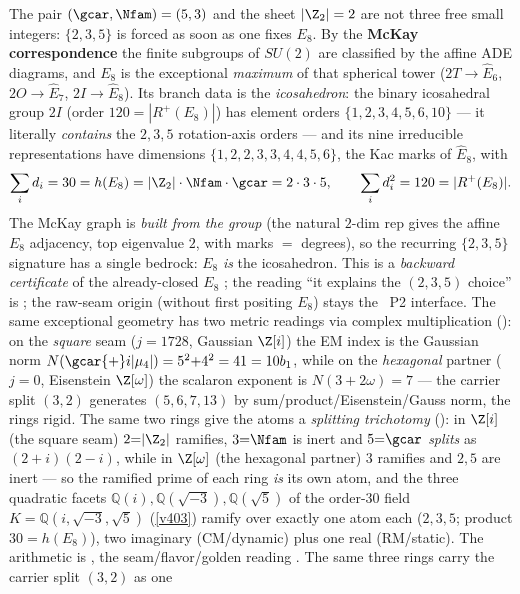 \begin{keybox}
The pair $(\gcar,\Nfam)=(5,3)$ and the sheet $|\Z_2|=2$ are not three free small integers: $\{2,3,5\}$ is
forced as soon as one fixes $E_8$. By the \textbf{McKay correspondence} the finite subgroups of $SU(2)$ are
classified by the affine ADE diagrams, and $E_8$ is the exceptional \emph{maximum} of that spherical tower
($2T{\to}\hat E_6$, $2O{\to}\hat E_7$, $2I{\to}\hat E_8$). Its branch data is the \emph{icosahedron}: the
binary icosahedral group $2I$ (order $120{=}|R^+(E_8)|$) has element orders $\{1,2,3,4,5,6,10\}$ --- it
literally \emph{contains} the $2,3,5$ rotation-axis orders --- and its nine irreducible representations have
dimensions $\{1,2,2,3,3,4,4,5,6\}$, the Kac marks of $\hat E_8$, with
\[
  \sum_i d_i = 30 = h(E_8) = |\Z_2|\cdot\Nfam\cdot\gcar = 2\cdot3\cdot5,\qquad
  \sum_i d_i^2 = 120 = |R^+(E_8)| .
\]
The McKay graph is \emph{built from the group} (the natural $2$-dim rep gives the affine $E_8$ adjacency,
top eigenvalue $2$, with marks $=$ degrees), so the recurring $\{2,3,5\}$ signature has a single bedrock:
$E_8$ \emph{is} the icosahedron. This is a \emph{backward certificate} of the already-closed $E_8$ \mE; the
reading ``it explains the $(2,3,5)$ choice'' is \mC; the raw-seam origin (without first positing $E_8$) stays
the \mO\ P2 interface. The same exceptional geometry has two metric readings via complex multiplication
(): on the \emph{square} seam ($j{=}1728$, Gaussian $\Z[i]$) the EM index is
the Gaussian norm $N(\gcar{+}i|\mu_4|)=5^2{+}4^2=41=10b_1$, while on the \emph{hexagonal} partner ($j{=}0$,
Eisenstein $\Z[\omega]$) the scalaron exponent is $N(3{+}2\omega)=7$ --- the carrier split $(3,2)$ generates
$(5,6,7,13)$ by sum/product/Eisenstein/Gauss norm, the rings rigid. The same two rings give the atoms a
\emph{splitting trichotomy} (): in $\Z[i]$ (the square seam) $2{=}|\Z_2|$
ramifies, $3{=}\Nfam$ is inert and $5{=}\gcar$ \emph{splits} as $(2{+}i)(2{-}i)$, while in $\Z[\omega]$ (the
hexagonal partner) $3$ ramifies and $2,5$ are inert --- so the ramified prime of each ring \emph{is} its own
atom, and the three quadratic facets $\mathbb Q(i),\mathbb Q(\sqrt{-3}),\mathbb Q(\sqrt5)$ of the order-$30$
field $K=\mathbb Q(i,\sqrt{-3},\sqrt5)$ (\vref{v403}) ramify over exactly one atom each ($2,3,5$; product
$30=h(E_8)$), two imaginary (CM/dynamic) plus one real (RM/static). The arithmetic is \mE, the
seam/flavor/golden reading \mC. The same three rings carry the carrier split $(3,2)$ as one

\end{keybox}

